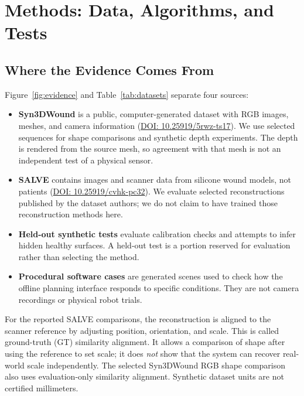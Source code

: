 \documentclass[conference]{IEEEtran}
\begin{document}
\section{Methods: Data, Algorithms, and Tests}

\subsection{Where the Evidence Comes From}

Figure~\ref{fig:evidence} and Table~\ref{tab:datasets} separate four sources:

\begin{itemize}
    \item \textbf{Syn3DWound} is a public, computer-generated dataset with
    RGB images, meshes, and camera information
    (\href{https://doi.org/10.25919/5rwz-ts17}{DOI: 10.25919/5rwz-ts17}).
    We use selected sequences for shape comparisons and synthetic depth
    experiments. The depth is rendered from the source mesh, so agreement
    with that mesh is not an independent test of a physical sensor.
    \item \textbf{SALVE} contains images and scanner data from silicone wound
    models, not patients
    (\href{https://doi.org/10.25919/cvhk-pc32}{DOI: 10.25919/cvhk-pc32}).
    We evaluate selected reconstructions published by the dataset authors;
    we do not claim to have trained those reconstruction methods here.
    \item \textbf{Held-out synthetic tests} evaluate calibration checks and
    attempts to infer hidden healthy surfaces. A held-out test is a portion
    reserved for evaluation rather than selecting the method.
    \item \textbf{Procedural software cases} are generated scenes used to
    check how the offline planning interface responds to specific conditions.
    They are not camera recordings or physical robot trials.
\end{itemize}

For the reported SALVE comparisons, the reconstruction is aligned to the
scanner reference by adjusting position, orientation, and scale. This is
called ground-truth (GT) similarity alignment. It allows a comparison of
shape after using the reference to set scale; it does \emph{not} show that
the system can recover real-world scale independently. The selected
Syn3DWound RGB shape comparison also uses evaluation-only similarity
alignment. Synthetic dataset units are not certified millimeters.
\end{document}
